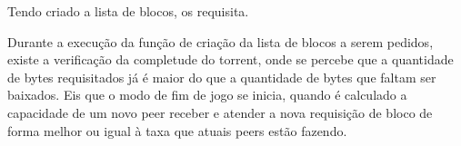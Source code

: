 \newpage
Tendo criado a lista de blocos, os requisita.


Durante a execução da função de criação da lista de blocos a serem pedidos, existe a
verificação da completude do \gls*{torrent}, onde se percebe que a quantidade de bytes
requisitados já é maior do que a quantidade de bytes que faltam ser baixados. Eis que o
modo de fim de jogo se inicia, quando é calculado a capacidade de um novo \gls*{peer}
receber e atender a nova requisição de bloco de forma melhor ou igual à taxa que
atuais \glspl*{peer} estão fazendo.

